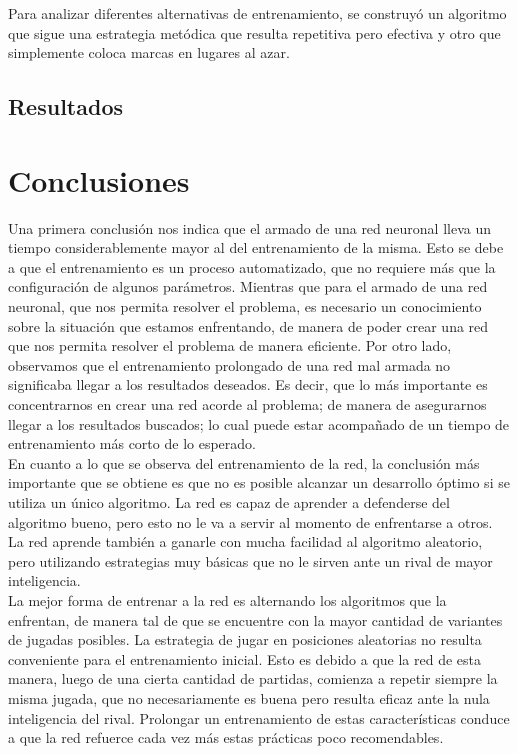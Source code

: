 \documentclass[12pt,titlepage]{article}
\begin{document}
Para analizar diferentes alternativas de entrenamiento, se construy\'o un algoritmo que sigue una estrategia met\'odica que resulta repetitiva pero efectiva y otro que simplemente coloca marcas en lugares al azar.

\subsection{Resultados}

\pagebreak
\section{Conclusiones}
Una primera conclusi\'on nos indica que el armado de una red neuronal lleva un tiempo considerablemente mayor al del entrenamiento de la misma. Esto se debe a que el entrenamiento es un proceso automatizado, que no requiere m\'as que la conﬁguraci\'on de algunos par\'ametros. Mientras que para el armado de una red neuronal, que nos permita resolver el problema, es necesario un conocimiento sobre la situaci\'on que
estamos enfrentando, de manera de poder crear una red que nos permita resolver el problema de manera eﬁciente. Por otro lado, observamos que el entrenamiento prolongado de una red mal armada no signiﬁcaba llegar a los resultados deseados. Es decir, que lo m\'as importante es concentrarnos en crear una red acorde al problema; de manera de asegurarnos llegar a los resultados buscados; lo cual puede estar acompa\~nado de un tiempo de entrenamiento m\'as corto de lo esperado. \\

En cuanto a lo que se observa del entrenamiento de la red, la conclusi\'on m\'as importante que se obtiene es que no es posible alcanzar un desarrollo \'optimo si se utiliza un \'unico algoritmo. La red es capaz de aprender a defenderse del algoritmo bueno, pero esto no le va a servir al momento de enfrentarse a otros. La red aprende tambi\'en a ganarle con mucha facilidad al algoritmo aleatorio, pero utilizando estrategias muy b\'asicas que no le sirven ante un rival de mayor inteligencia. \\

La mejor forma de entrenar a la red es alternando los algoritmos que la enfrentan, de manera tal de que se encuentre con la mayor cantidad de variantes de jugadas posibles. La estrategia de jugar en posiciones aleatorias no resulta conveniente para el entrenamiento inicial. Esto es debido a que la red de esta manera, luego de una cierta cantidad de partidas, comienza a repetir siempre la misma jugada, que no necesariamente es buena pero resulta eficaz ante la nula inteligencia del rival. Prolongar un entrenamiento de estas caracter\'isticas conduce a que la red refuerce cada vez m\'as estas pr\'acticas poco recomendables. \\
\end{document}
